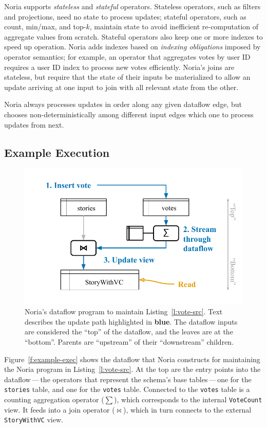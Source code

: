 Noria supports \emph{stateless} and \emph{stateful} operators. Stateless
operators, such as filters and projections, need no state to process updates;
stateful operators, such as count, min/max, and top-$k$, maintain state to avoid
inefficient re-computation of aggregate values from scratch. Stateful operators
also keep one or more indexes to speed up operation. Noria adds indexes based on
\emph{indexing obligations} imposed by operator semantics; for example, an
operator that aggregates votes by user ID requires a user ID index to process
new votes efficiently. Noria's joins are stateless, but require that the state
of their inputs be materialized to allow an update arriving at one input to join
with all relevant state from the other.

Noria always processes updates in order along any given dataflow edge, but
chooses non-deterministically among different input edges which one to process
updates from next.

\subsection*{Example Execution}

\begin{figure}[t]
  \centering
  \includegraphics{diagrams/Example Execution.pdf}
  \caption{Noria's dataflow program to maintain Listing~\ref{l:vote-src}. Text
  describes the update path highlighted in \textbf{\color{set1}blue}. The
  dataflow inputs are considered the ``top'' of the dataflow, and the leaves are
  at the ``bottom''. Parents are ``upstream'' of their ``downstream'' children.}
  \label{f:example-exec}
\end{figure}

Figure~\vref{f:example-exec} shows the dataflow that Noria constructs for
maintaining the Noria program in Listing~\vref{l:vote-src}. At the top are the
entry points into the dataflow\,---\,the operators that represent the schema's
base tables\,---\,one for the \texttt{stories} table, and one for the
\texttt{votes} table. Connected to the \texttt{votes} table is a counting
aggregation operator ($\sum$), which corresponds to the internal
\texttt{VoteCount} view. It feeds into a join operator ($\bowtie$), which in
turn connects to the external \texttt{StoryWithVC} view.

